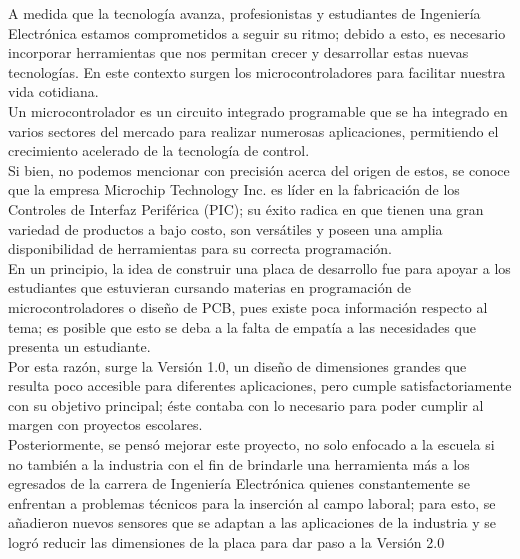 \documentclass[times, 10pt,twocolumn]{article}
\begin{document}
\raggedbottom
A medida que la tecnología avanza, profesionistas y estudiantes de Ingeniería Electrónica estamos comprometidos a seguir su ritmo; debido a esto, es necesario incorporar herramientas que nos permitan crecer y desarrollar estas nuevas tecnologías. En este contexto surgen los microcontroladores para facilitar nuestra vida cotidiana.\\

Un microcontrolador es un circuito integrado programable que se ha integrado en varios sectores del mercado para realizar numerosas aplicaciones, permitiendo el crecimiento acelerado de la tecnología de control.\\

Si bien, no podemos mencionar con precisión acerca del origen de estos, se conoce que la empresa Microchip Technology Inc. es líder en la fabricación de los Controles de Interfaz Periférica (PIC); su éxito radica en que tienen una gran variedad de productos a bajo costo, son versátiles y poseen una amplia disponibilidad de herramientas para su correcta programación.~\cite{ex1}\\ 


En un principio, la idea de construir una placa de desarrollo fue para apoyar a los estudiantes que estuvieran cursando materias en programación de microcontroladores o diseño de PCB, pues existe poca información respecto al tema; es posible que esto se deba a la falta de empatía a las necesidades que presenta un estudiante.\\

Por esta razón, surge la Versión 1.0, un diseño de dimensiones grandes que resulta poco accesible para diferentes aplicaciones, pero cumple satisfactoriamente con su objetivo principal; éste contaba con lo necesario para poder cumplir al margen con proyectos escolares.\\

Posteriormente, se pensó mejorar este proyecto, no solo enfocado a la escuela si no también a la industria con el fin de brindarle una herramienta más a los
egresados de la carrera de Ingeniería Electrónica quienes constantemente se enfrentan a problemas técnicos para la inserción al campo laboral; para esto,
se añadieron nuevos sensores que se adaptan a las aplicaciones de la industria y se logró reducir las dimensiones de la placa para dar paso a la Versión 2.0\\
\end{document}
